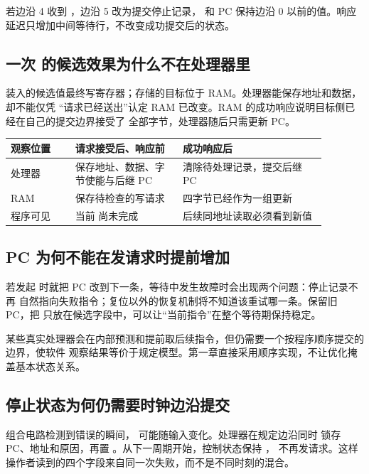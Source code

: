 若边沿 4 收到 ，边沿 5 改为提交停止记录， 和 PC 保持边沿 0
以前的值。响应延迟只增加中间等待行，不改变成功提交后的状态。

\subsection{一次  的候选效果为什么不在处理器里}

装入的候选值最终写寄存器；存储的目标位于 RAM。处理器能保存地址和数据，却不能仅凭
“请求已经送出”认定 RAM 已改变。RAM 的成功响应说明目标侧已经在自己的提交边界接受了
全部字节，处理器随后只需更新 PC。

\begin{longtable}{|L{0.18\linewidth}|L{0.30\linewidth}|L{0.40\linewidth}|}
\hline
{}
观察位置 & 请求接受后、响应前 & 成功响应后 \\ \hline
处理器 & 保存地址、数据、字节使能与后继 PC & 清除待处理记录，提交后继 PC \\ \hline
RAM & 保存待检查的写请求 & 四字节已经作为一组更新 \\ \hline
程序可见 & 当前  尚未完成 & 后续同地址读取必须看到新值 \\ \hline
\end{longtable}

\subsection{PC 为何不能在发请求时提前增加}

若发起  时就把 PC 改到下一条，等待中发生故障时会出现两个问题：停止记录不再
自然指向失败指令；复位以外的恢复机制将不知道该重试哪一条。保留旧 PC，把
 只放在候选字段中，可以让“当前指令”在整个等待期保持稳定。

某些真实处理器会在内部预测和提前取后续指令，但仍需要一个按程序顺序提交的边界，使软件
观察结果等价于规定模型。第一章直接采用顺序实现，不让优化掩盖基本状态关系。

\subsection{停止状态为何仍需要时钟边沿提交}

组合电路检测到错误的瞬间， 可能随输入变化。处理器在规定边沿同时
锁存 PC、地址和原因，再置 。从下一周期开始，控制状态保持 ，
不再发请求。这样操作者读到的四个字段来自同一次失败，而不是不同时刻的混合。

